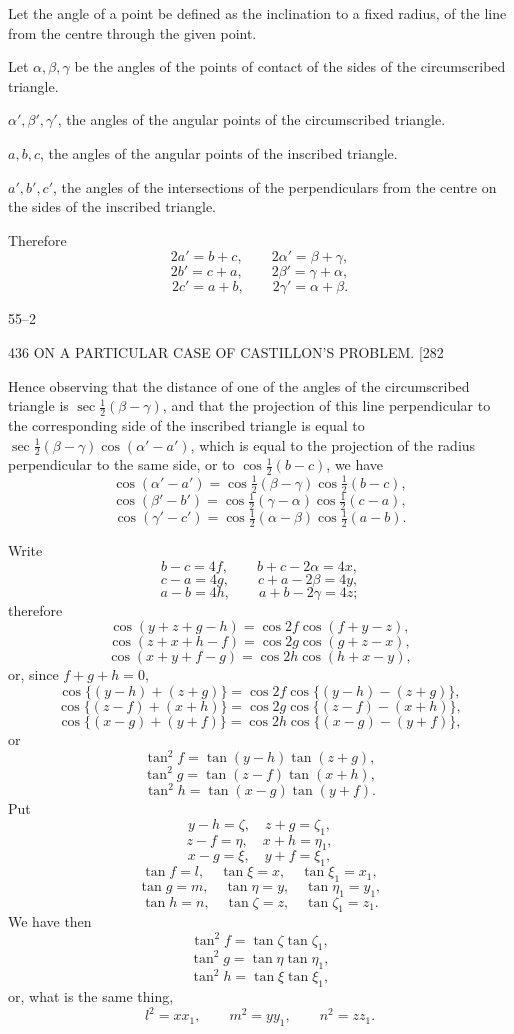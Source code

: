 \documentclass[11pt]{article}
\begin{document}
Let the angle of a point be defined as the inclination to a fixed radius, of the
line from the centre through the given point.

Let $\alpha,\beta,\gamma$ be the angles of the points of contact of the sides of the
circumscribed triangle.

$\alpha',\beta',\gamma'$, the angles of the angular points of the circumscribed triangle.

$a,b,c$, the angles of the angular points of the inscribed triangle.

$a',b',c'$, the angles of the intersections of the perpendiculars from the centre
on the sides of the inscribed triangle.

Therefore
\[ 2a'=b+c,\qquad 2\alpha'=\beta+\gamma, \]
\[ 2b'=c+a,\qquad 2\beta'=\gamma+\alpha, \]
\[ 2c'=a+b,\qquad 2\gamma'=\alpha+\beta. \]

\begin{center}55--2\end{center}

\begin{center}
436 \hfill ON A PARTICULAR CASE OF CASTILLON'S PROBLEM. \hfill \textsc{[282}
\end{center}

Hence observing that the distance of one of the angles of the circumscribed triangle
is $\sec\tfrac{1}{2}(\beta-\gamma)$, and that the projection of this line perpendicular
to the corresponding side of the inscribed triangle is equal to
$\sec\tfrac{1}{2}(\beta-\gamma)\cos(\alpha'-a')$, which is equal to the projection
of the radius perpendicular to the same side, or to $\cos\tfrac{1}{2}(b-c)$, we have
\[ \cos(\alpha'-a')=\cos\tfrac{1}{2}(\beta-\gamma)\cos\tfrac{1}{2}(b-c), \]
\[ \cos(\beta'-b')=\cos\tfrac{1}{2}(\gamma-\alpha)\cos\tfrac{1}{2}(c-a), \]
\[ \cos(\gamma'-c')=\cos\tfrac{1}{2}(\alpha-\beta)\cos\tfrac{1}{2}(a-b). \]

Write
\[ b-c=4f,\qquad b+c-2\alpha=4x, \]
\[ c-a=4g,\qquad c+a-2\beta=4y, \]
\[ a-b=4h,\qquad a+b-2\gamma=4z; \]
therefore
\[ \cos(y+z+g-h)=\cos 2f\cos(f+y-z), \]
\[ \cos(z+x+h-f)=\cos 2g\cos(g+z-x), \]
\[ \cos(x+y+f-g)=\cos 2h\cos(h+x-y), \]
or, since $f+g+h=0$,
\[ \cos\{(y-h)+(z+g)\}=\cos 2f\cos\{(y-h)-(z+g)\}, \]
\[ \cos\{(z-f)+(x+h)\}=\cos 2g\cos\{(z-f)-(x+h)\}, \]
\[ \cos\{(x-g)+(y+f)\}=\cos 2h\cos\{(x-g)-(y+f)\}, \]
or
\[ \tan^{2}f=\tan(y-h)\tan(z+g), \]
\[ \tan^{2}g=\tan(z-f)\tan(x+h), \]
\[ \tan^{2}h=\tan(x-g)\tan(y+f). \]
Put
\[ y-h=\zeta,\quad z+g=\zeta_{1}, \]
\[ z-f=\eta,\quad x+h=\eta_{1}, \]
\[ x-g=\xi,\quad y+f=\xi_{1}, \]
\[ \tan f=l,\quad \tan\xi=x,\quad \tan\xi_{1}=x_{1}, \]
\[ \tan g=m,\quad \tan\eta=y,\quad \tan\eta_{1}=y_{1}, \]
\[ \tan h=n,\quad \tan\zeta=z,\quad \tan\zeta_{1}=z_{1}. \]
We have then
\[ \tan^{2}f=\tan\zeta\tan\zeta_{1}, \]
\[ \tan^{2}g=\tan\eta\tan\eta_{1}, \]
\[ \tan^{2}h=\tan\xi\tan\xi_{1}, \]
or, what is the same thing,
\[ l^{2}=xx_{1},\qquad m^{2}=yy_{1},\qquad n^{2}=zz_{1}. \]
\end{document}
